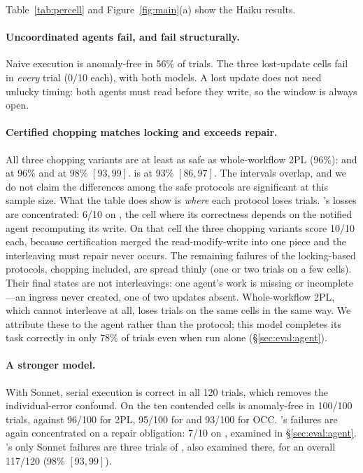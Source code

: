Table~\ref{tab:percell} and Figure~\ref{fig:main}(a) show the Haiku results.

\paragraph{Uncoordinated agents fail, and fail structurally.}
Naive execution is anomaly-free in 56\% of trials. The three lost-update cells
fail in \emph{every} trial (0/10 each), with both models. A lost update does
not need unlucky timing: both agents must read before they write, so the
window is always open.

\paragraph{Certified chopping matches locking and exceeds repair.}
All three chopping variants are at least as safe as whole-workflow 2PL
(96\%): \cc and \cctwo at 96\% and \ccs at 98\% $[93, 99]$. \mtpo is at 93\%
$[86, 97]$. The intervals overlap, and we do not claim the differences among
the safe protocols are significant at this sample size. What the table does
show is \emph{where} each protocol loses trials. \mtpo's losses are
concentrated: 6/10 on , the cell where its correctness
depends on the notified agent recomputing its write. On that cell the three
chopping variants score 10/10 each, because certification merged the
read-modify-write into one piece and the interleaving \mtpo must repair never
occurs. The remaining failures of the locking-based protocols, chopping
included, are spread thinly (one or two trials on a few cells). Their final
states are not interleavings: one agent's work is missing or incomplete---an
ingress never created, one of two updates absent. Whole-workflow 2PL, which
cannot interleave at all, loses trials on the same cells in the same way. We
attribute these to the agent rather than the protocol; this model completes
its task correctly in only 78\% of trials even when run alone
(\S\ref{sec:eval:agent}).

\paragraph{A stronger model.}
With Sonnet, serial execution is correct in all 120 trials, which removes the
individual-error confound. On the ten contended cells \cc is anomaly-free in
100/100 trials, against 96/100 for 2PL, 95/100 for \mtpo and 93/100 for OCC.
\mtpo's failures are again concentrated on a repair obligation: 7/10 on
, examined in \S\ref{sec:eval:agent}. \cc's only
Sonnet failures are three trials of , also examined there, for
an overall 117/120 (98\% $[93, 99]$).

